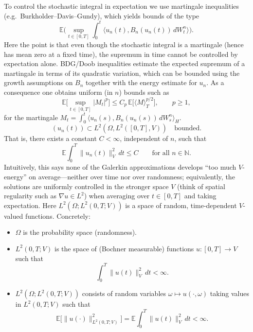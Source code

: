 \documentclass[11pt]{article}
\theoremstyle{definition}
\theoremstyle{remark}
\begin{document}
\medskip
\noindent
To control the stochastic integral in expectation we use martingale inequalities (e.g.\ Burkholder--Davis--Gundy), which yields bounds of the type
\[
\mathbb{E}\Big(\sup_{t\in[0,T]}\int_{0}^{t}\langle u_{n}(t),B_{n}(u_{n}(t))\,dW_{t}^{n}\rangle\Big).
\]
Here the point is that even though the stochastic integral is a martingale (hence has mean zero at a fixed time), the supremum in time cannot be controlled by expectation alone. BDG/Doob inequalities estimate the expected supremum of a martingale in terms of its quadratic variation, which can be bounded using the growth assumptions on \(B_n\) together with the energy estimate for \(u_n\). As a consequence one obtains uniform (in \(n\)) bounds such as
\[
\mathbb{E}\Big[\sup_{t\in[0,T]}|M_t|^{p}\Big]\le C_p\,\mathbb{E}\big[\langle M\rangle_T^{p/2}\big],
\qquad p\ge 1,
\]
for the martingale \(M_t=\int_0^t \langle u_n(s),B_n(u_n(s))\,dW_s^n\rangle_H\).
\[
(u_{n}(t))\subset L^{2}(\Omega,L^{2}([0,T],V))
\quad \text{bounded.}
\]
That is, there exists a constant \(C<\infty\), independent of \(n\), such that
\[
\mathbb{E}\int_{0}^{T}\|u_n(t)\|_{V}^{2}\,dt\le C
\qquad \text{for all }n\in\mathbb{N}.
\]
Intuitively, this says none of the Galerkin approximations develops ``too much \(V\)-energy'' on average---neither over time nor over randomness; equivalently, the solutions are uniformly controlled in the stronger space \(V\) (think of spatial regularity such as \(\nabla u\in L^{2}\)) when averaging over \(t\in[0,T]\) and taking expectation.
Here \(L^{2}(\Omega;L^{2}(0,T;V))\) is a space of random, time-dependent \(V\)-valued functions. Concretely:
\begin{itemize}
\item \(\Omega\) is the probability space (randomness).
\item \(L^{2}(0,T;V)\) is the space of (Bochner measurable) functions \(u:[0,T]\to V\) such that
\[
\int_{0}^{T}\|u(t)\|_{V}^{2}\,dt<\infty.
\]
\item \(L^{2}(\Omega;L^{2}(0,T;V))\) consists of random variables \(\omega\mapsto u(\cdot,\omega)\) taking values in \(L^{2}(0,T;V)\) such that
\[
\mathbb{E}\big[\|u(\cdot)\|_{L^{2}(0,T;V)}^{2}\big]
=\mathbb{E}\int_{0}^{T}\|u(t)\|_{V}^{2}\,dt<\infty.
\]
\end{itemize}
\medskip
\noindent
\end{document}
